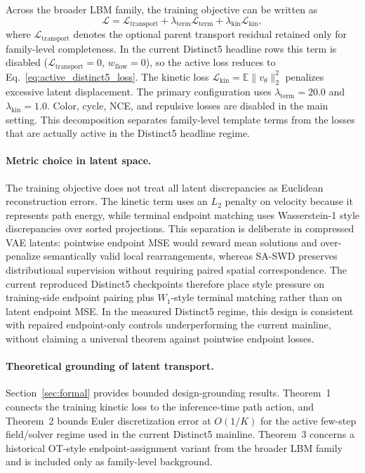 \documentclass[letterpaper]{article}
\begin{document}
Across the broader LBM family, the training objective can be written as
\begin{equation}
    \mathcal{L} = \mathcal{L}_{\mathrm{transport}} + \lambda_{\mathrm{term}}\mathcal{L}_{\mathrm{term}} + \lambda_{\mathrm{kin}}\mathcal{L}_{\mathrm{kin}},
\end{equation}
where $\mathcal{L}_{\mathrm{transport}}$ denotes the optional parent transport residual retained only for family-level completeness. In the current Distinct5 headline rows this term is disabled ($\mathcal{L}_{\mathrm{transport}}=0$, $w_{\mathrm{flow}}=0$), so the active loss reduces to Eq.~\eqref{eq:active_distinct5_loss}. The kinetic loss $\mathcal{L}_{\mathrm{kin}} = \mathbb{E}\|v_\theta\|_2^2$ penalizes excessive latent displacement. The primary configuration uses $\lambda_{\mathrm{term}}=20.0$ and $\lambda_{\mathrm{kin}}=1.0$. Color, cycle, NCE, and repulsive losses are disabled in the main setting. This decomposition separates family-level template terms from the losses that are actually active in the Distinct5 headline regime.

\paragraph{Metric choice in latent space.}
The training objective does not treat all latent discrepancies as Euclidean reconstruction errors. The kinetic term uses an $L_2$ penalty on velocity because it represents path energy, while terminal endpoint matching uses Wasserstein-1 style discrepancies over sorted projections. This separation is deliberate in compressed VAE latents: pointwise endpoint MSE would reward mean solutions and over-penalize semantically valid local rearrangements, whereas SA-SWD preserves distributional supervision without requiring paired spatial correspondence. The current reproduced Distinct5 checkpoints therefore place style pressure on training-side endpoint pairing plus $W_1$-style terminal matching rather than on latent endpoint MSE. In the measured Distinct5 regime, this design is consistent with repaired endpoint-only controls underperforming the current mainline, without claiming a universal theorem against pointwise endpoint losses.

\paragraph{Theoretical grounding of latent transport.}
Section~\ref{sec:formal} provides bounded design-grounding results. Theorem~1 connects the training kinetic loss to the inference-time path action, and Theorem~2 bounds Euler discretization error at $O(1/K)$ for the active few-step field/solver regime used in the current Distinct5 mainline. Theorem~3 concerns a historical OT-style endpoint-assignment variant from the broader LBM family and is included only as family-level background.
\end{document}
